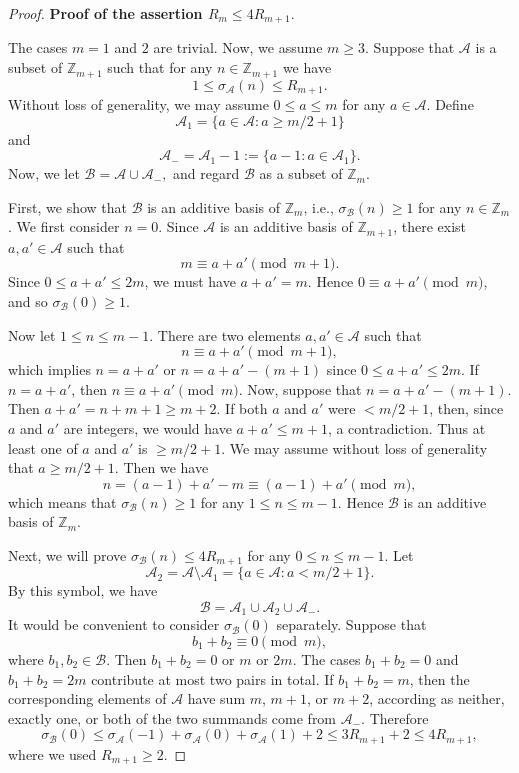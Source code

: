 \documentclass[12pt,a4paper,reqno]{amsart}
\numberwithin{equation}{section}
\theoremstyle{plain}
\theoremstyle{definition}
\begin{document}
\begin{proof}
\medskip

{\bf Proof of the assertion $R_{m}\le 4R_{m+1}$}. 

The cases $m=1$ and $2$ are trivial. Now, we assume $m\ge 3$.
Suppose that $\mathcal{A}$ is a subset of $\mathbb{Z}_{m+1}$ such that for any $n\in \mathbb{Z}_{m+1}$ we have
 $$
 1\le \sigma_{\mathcal{A}}(n)\le R_{m+1}.
 $$
Without loss of generality, we may assume $0\le a\le m$ for any $a\in \mathcal{A}$. Define
$$
\mathcal{A}_{1}=\big\{a\in \mathcal{A}: a\ge m/2+1\big\}
$$
and
$$
\mathcal{A}_{-}=\mathcal{A}_{1}-1:=\{a-1: a\in \mathcal{A}_{1}\}.
$$
Now, we let
$
\mathcal{B}=\mathcal{A}\cup \mathcal{A}_{-},
$
and regard $\mathcal{B}$ as a subset of $\mathbb{Z}_{m}$.

First, we show that $\mathcal{B}$ is an additive basis of $\mathbb{Z}_{m}$, i.e., $\sigma_{\mathcal{B}}(n)\ge 1$ for any $n\in \mathbb{Z}_{m}$. We first consider $n=0$. Since $\mathcal A$ is an additive basis of $\mathbb Z_{m+1}$, there exist $a,a'\in\mathcal A$ such that
$$
m\equiv a+a'\pmod{m+1}.
$$
Since $0\le a+a'\le 2m$, we must have $a+a'=m$. Hence $0\equiv a+a'\pmod m$, and so $\sigma_{\mathcal B}(0)\ge1$.

Now let $1\le n\le m-1$. There are two elements $a, a'\in \mathcal{A}$ such that
$$
n\equiv a+a'\pmod{m+1},
$$
which implies $n=a+a'$ or $n=a+a'-(m+1)$ since $0\le a+a'\le 2m$. If $n=a+a'$, then 
$
n\equiv a+a'\pmod{m}.
$
Now, suppose that $n=a+a'-(m+1)$. Then $a+a'=n+m+1\ge m+2$. If both $a$ and $a'$ were $<m/2+1$, then, since $a$ and $a'$ are integers, we would have $a+a'\le m+1$, a contradiction. Thus at least one of $a$ and $a'$ is $\ge m/2+1$. We may assume without loss of generality that $a\ge m/2+1$. Then we have
$$
n=(a-1)+a'-m\equiv (a-1)+a'\pmod{m},
$$
which means that $\sigma_{\mathcal{B}}(n)\ge 1$ for any $1\le n\le m-1$. Hence $\mathcal B$ is an additive basis of $\mathbb Z_m$.

Next, we will prove $\sigma_{\mathcal{B}}(n)\le 4R_{m+1}$ for any $0\le n\le m-1$. Let
$$
\mathcal{A}_{2}=\mathcal{A}\setminus\mathcal{A}_1=\big\{a\in \mathcal{A}: a< m/2+1\big\}.
$$
By this symbol, we have
$$
\mathcal{B}=\mathcal{A}_1\cup \mathcal{A}_{2}\cup\mathcal{A}_{-}.
$$
It would be convenient to consider $\sigma_{\mathcal{B}}(0)$ separately. Suppose that
$$
b_1+b_2\equiv 0\pmod{m},
$$
where $b_1,b_2\in\mathcal B$. Then $b_1+b_2=0$ or $m$ or $2m$. The cases $b_1+b_2=0$ and $b_1+b_2=2m$ contribute at most two pairs in total. If $b_1+b_2=m$, then the corresponding elements of $\mathcal A$ have sum $m$, $m+1$, or $m+2$, according as neither, exactly one, or both of the two summands come from $\mathcal A_-$. Therefore
$$
\sigma_{\mathcal{B}}(0)\le \sigma_{\mathcal{A}}(-1)+\sigma_{\mathcal{A}}(0)+\sigma_{\mathcal{A}}(1)+2\le 3R_{m+1}+2\le 4R_{m+1},
$$
where we used $R_{m+1}\ge 2$.


\end{proof}
\end{document}
